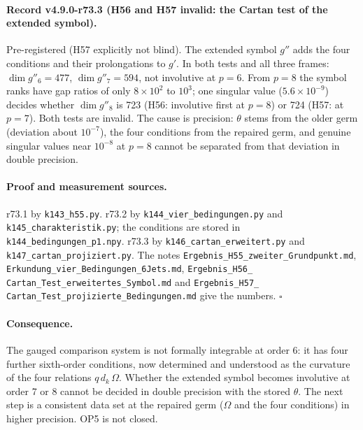 \paragraph{Record v4.9.0-r73.3 (H56 and H57 invalid: the Cartan test of the extended symbol).}
Pre-registered (H57 explicitly not blind).  The extended symbol \(g''\) adds the four conditions and their prolongations to
\(g'\).  In both tests and all three frames: \(\dim g''_6=477\), \(\dim g''_7=594\), not involutive at \(p=6\).  From \(p=8\)
the symbol ranks have gap ratios of only \(8\times10^2\) to \(10^3\); one singular value (\(5.6\times10^{-9}\)) decides whether
\(\dim g''_8\) is 723 (H56: involutive first at \(p=8\)) or 724 (H57: at \(p=7\)).  Both tests are invalid.  The cause is
precision: \(\theta\) stems from the older germ (deviation about \(10^{-7}\)), the four conditions from the repaired germ, and
genuine singular values near \(10^{-8}\) at \(p=8\) cannot be separated from that deviation in double precision.

\paragraph{Proof and measurement sources.}
r73.1 by \texttt{k143\_h55.py}.  r73.2 by \texttt{k144\_vier\_bedingungen.py} and \texttt{k145\_charakteristik.py}; the
conditions are stored in \texttt{k144\_bedingungen\_p1.npy}.  r73.3 by \texttt{k146\_cartan\_erweitert.py} and
\texttt{k147\_cartan\_projiziert.py}.  The notes \texttt{Ergebnis\_H55\_\allowbreak zweiter\_\allowbreak Grundpunkt.md},
\texttt{Erkundung\_\allowbreak vier\_\allowbreak Bedingungen\_\allowbreak 6Jets.md}, \texttt{Ergebnis\_H56\_\allowbreak
Cartan\_\allowbreak Test\_\allowbreak erweitertes\_\allowbreak Symbol.md} and \texttt{Ergebnis\_H57\_\allowbreak
Cartan\_\allowbreak Test\_\allowbreak projizierte\_\allowbreak Bedingungen.md} give the numbers.  \(\square\)

\paragraph{Consequence.}
The gauged comparison system is not formally integrable at order 6: it has four further sixth-order conditions, now
determined and understood as the curvature of the four relations \(q\,d_k\,\Omega\).  Whether the extended symbol becomes
involutive at order 7 or 8 cannot be decided in double precision with the stored \(\theta\).  The next step is a consistent
data set at the repaired germ (\(\Omega\) and the four conditions) in higher precision.  OP5 is not closed.

